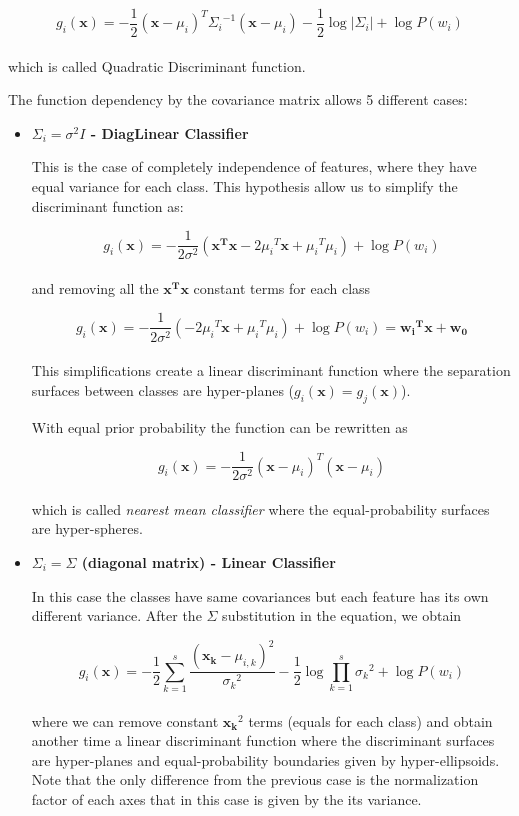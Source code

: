 \documentclass{standalone}
\begin{document}
$$
g_i(\mathbf{x}) = -\frac{1}{2}(\mathbf{x}-\mu_i)^T{\Sigma_i}^{-1}(\mathbf{x}-\mu_i) -\frac{1}{2}\log\left|\Sigma_i\right|+\log P(w_i)
$$
\\
which is called Quadratic Discriminant function.

The function dependency by the covariance matrix allows 5 different cases:

\begin{itemize}

\item \textbf{$\Sigma_i=\sigma^2I$ - DiagLinear Classifier}

This is the case of completely independence of features, where they have equal variance for each class.
This hypothesis allow us to simplify the discriminant function as:

$$
g_i(\mathbf{x})=-\frac{1}{2\sigma^2}(\mathbf{x^Tx}-2{\mu_i}^T\mathbf{x} + {\mu_i}^T\mu_i) + \log P(w_i)
$$
\\
and removing all the $\mathbf{x^Tx}$ constant terms for each class

$$
g_i(\mathbf{x}) = -\frac{1}{2\sigma^2}(-2{\mu_i}^T\mathbf{x}+{\mu_i}^T\mu_i)+\log P(w_i) = \mathbf{{w_i}^Tx}+\mathbf{w_0}
$$
\\
This simplifications create a linear discriminant function where the separation surfaces between classes are hyper-planes ($g_i(\mathbf{x})=g_j(\mathbf{x})$).

With equal prior probability the function can be rewritten as

$$
g_i(\mathbf{x}) = -\frac{1}{2\sigma^2}(\mathbf{x}-\mu_i)^T(\mathbf{x}-\mu_i)
$$
\\
which is called \emph{nearest mean classifier} where the equal-probability surfaces are hyper-spheres.


\item \textbf{$\Sigma_i = \Sigma$ (diagonal matrix) - Linear Classifier}

In this case the classes have same covariances but each feature has its own different variance.
After the $\Sigma$ substitution in the equation, we obtain

$$
g_i(\mathbf{x}) = -\frac{1}{2}\sum_{k=1}^{s}\frac{(\mathbf{x_k}-\mu_{i,k})^2}{{\sigma_k}^2}-\frac{1}{2}\log\prod_{k=1}^{s}{\sigma_k}^2+\log P(w_i)
$$
\\
where we can remove constant $\mathbf{x_k}^2$ terms (equals for each class) and obtain another time a linear discriminant function where the discriminant surfaces are hyper-planes and equal-probability boundaries given by hyper-ellipsoids.
Note that the only difference from the previous case is the normalization factor of each axes that in this case is given by the its variance.



\end{itemize}
\end{document}
